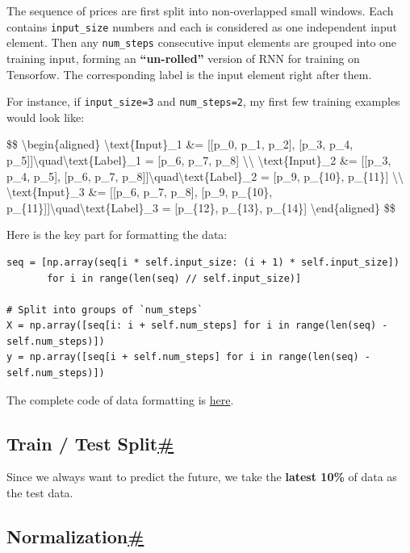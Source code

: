 The sequence of prices are first split into non-overlapped small windows. Each contains \texttt{input\_size} numbers and each is considered as one independent input element. Then any \texttt{num\_steps} consecutive input elements are grouped into one training input, forming an \textbf{``un-rolled''} version of RNN for training on Tensorfow. The corresponding label is the input element right after them.

\label{input_format_example}{}For instance, if \texttt{input\_size=3} and \texttt{num\_steps=2}, my first few training examples would look like:

\$\$ \textbackslash begin\{aligned\} \textbackslash text\{Input\}\_1 \&= {[}{[}p\_0, p\_1, p\_2{]}, {[}p\_3, p\_4, p\_5{]}{]}\textbackslash quad\textbackslash text\{Label\}\_1 = {[}p\_6, p\_7, p\_8{]} \textbackslash\textbackslash{} \textbackslash text\{Input\}\_2 \&= {[}{[}p\_3, p\_4, p\_5{]}, {[}p\_6, p\_7, p\_8{]}{]}\textbackslash quad\textbackslash text\{Label\}\_2 = {[}p\_9, p\_\{10\}, p\_\{11\}{]} \textbackslash\textbackslash{} \textbackslash text\{Input\}\_3 \&= {[}{[}p\_6, p\_7, p\_8{]}, {[}p\_9, p\_\{10\}, p\_\{11\}{]}{]}\textbackslash quad\textbackslash text\{Label\}\_3 = {[}p\_\{12\}, p\_\{13\}, p\_\{14\}{]} \textbackslash end\{aligned\} \$\$

Here is the key part for formatting the data:

\begin{verbatim}
seq = [np.array(seq[i * self.input_size: (i + 1) * self.input_size]) 
       for i in range(len(seq) // self.input_size)]

# Split into groups of `num_steps`
X = np.array([seq[i: i + self.num_steps] for i in range(len(seq) - self.num_steps)])
y = np.array([seq[i + self.num_steps] for i in range(len(seq) - self.num_steps)])
\end{verbatim}

The complete code of data formatting is \href{https://github.com/lilianweng/stock-rnn/blob/master/data_wrapper.py}{here}.

\subsection{\texorpdfstring{Train / Test Split\hyperref[train--test-split]{\#}}{Train / Test Split\#}}\label{train--test-split}

Since we always want to predict the future, we take the \textbf{latest 10\%} of data as the test data.

\subsection{\texorpdfstring{Normalization\hyperref[normalization]{\#}}{Normalization\#}}\label{normalization}

